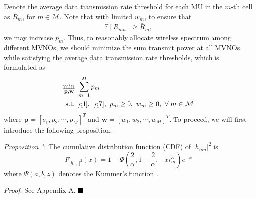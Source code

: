 \documentclass[journal]{IEEEtran}
\begin{document}
Denote the average data transmission rate threshold for each MU in the $m$-th cell as $\bar{R}_m$, for $m\in\mathcal{M}$. Note that with limited $w_m$, to ensure that
\begin{align}\label{q7}
\mathbb{E}\left[{R}_{mn}\right]\geq \bar{R}_m,
\end{align}
we may increase $p_m$. Thus, to reasonably allocate wireless spectrum among different MVNOs, we should minimize the sum transmit power at all MVNOs while satisfying the average data transmission rate thresholds, which is
formulated as
\begin{align}\label{q8}
\min_{\mathbf{p}, \mathbf{w}}\ & \sum\limits_{m=1}^{M} p_m \nonumber\\
\mbox{s.t.}\ &\eqref{q1},\ \eqref{q7},\ p_m \geq 0,\ w_m \geq 0,\ \forall\ m\in\mathcal{M}
\end{align}
where  $\mathbf{p} = \left[p_1, p_2, \cdots, p_M\right]^T$ and $\mathbf{w} = \left[w_1, w_2, \cdots, w_M\right]^T$. To proceed, we will first introduce the following proposition.

\textit{Proposition 1}: The cumulative distribution function (CDF) of $\left|h_{mn} \right|^2$ is
\begin{equation}\label{q9}
F_{\left|h_{mn} \right|^2}\left(x\right) = 1 - \Psi\left(\frac{2}{\alpha}, 1 + \frac{2}{\alpha}, - x r_m^{\alpha}\right)e^{-x}
\end{equation}
where $\Psi\left(a,b,z\right)$ denotes the Kummer's function \cite{MAbramowitz}.

\textit{Proof}: See Appendix A.  $\hfill\blacksquare$
\end{document}
